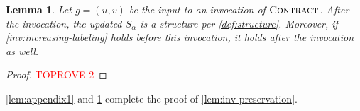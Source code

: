 \documentclass{article}
\newcommand{\alp}{\alpha}
\newcommand{\algContract}{\textsc{Contract}\xspace}
\newtheorem{lemma}[theorem]{Lemma}
\begin{document}
\begin{lemma} \label{lem:appendix2} Let $g = (u, v)$ be the input to an invocation of $\algContract$.
After the invocation, the updated $S_\alp$ is a structure per \cref{def:structure}.
Moreover, if \cref{inv:increasing-labeling} holds before this invocation, it holds after the invocation as well.
\end{lemma}
\begin{proof}\textcolor{red}{TOPROVE 2}\end{proof}

\noindent \cref{lem:appendix1} and \cref{lem:appendix2} complete the proof of \cref{lem:inv-preservation}.
\end{document}
